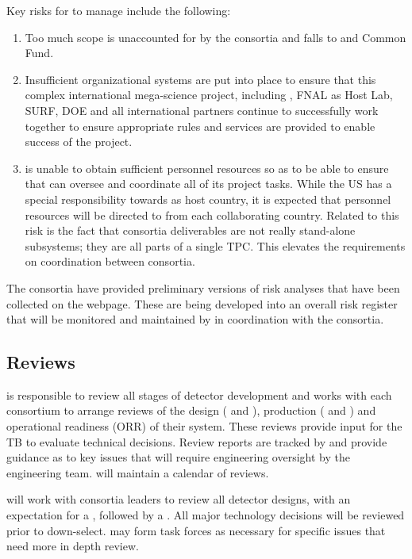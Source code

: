 Key risks for  to manage include the following:
\begin{enumerate}
    \item Too much scope is unaccounted for by the consortia and falls
      to  and Common Fund.
    \item Insufficient organizational systems are put into place to
      ensure that this complex international mega-science project,
      including , FNAL as Host Lab, SURF, DOE and all international
      partners continue to successfully work together to ensure
      appropriate rules and services are provided to enable success of
      the project.
  \item {} is unable to obtain sufficient personnel resources so as to
    be able to ensure that  can oversee and coordinate all of its
    project tasks.  While the US has a special responsibility towards
     as host country, it is expected that personnel resources will
    be directed to  from each collaborating country. Related to this
    risk is the fact that consortia deliverables are not really
    stand-alone subsystems; they are all parts of a single TPC. This
    elevates the requirements on coordination between consortia.
\end{enumerate}

The consortia have provided preliminary versions of risk analyses that
have been collected on the  webpage. These are being developed into
an overall risk register that will be monitored and maintained by 
in coordination with the consortia.

\subsection{Reviews}
\label{sec:fdsp-coord-reviews}

 is responsible to review all stages of detector development
and works with each consortium to arrange reviews of the design
( and ), production ( and
) and operational readiness (ORR) of their system.  These
reviews provide input for the TB to evaluate technical decisions.
Review reports are tracked by  and provide guidance as to
key issues that will require engineering oversight by the 
engineering team.  will maintain a calendar of 
reviews.

 will work with consortia leaders to review all detector designs,
with an expectation for a , followed by a .  All
major technology decisions will be reviewed prior to down-select.  
may form task forces as necessary for specific issues that need more
in depth review.


